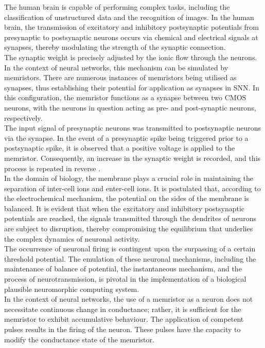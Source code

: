 \noindent The human brain is capable of performing complex tasks, including the classification of unstructured data and the recognition of images. In the human brain, the transmission of excitatory and inhibitory postsynaptic potentials from presynaptic to postsynaptic neurons occurs via chemical and electrical signals at synapses, thereby modulating the strength of the synaptic connection. \\

\noindent The synaptic weight is precisely adjusted by the ionic flow through the neurons. In the context of neural networks, this mechanism can be simulated by memristors. There are numerous instances of memristors being utilised as synapses, thus establishing their potential for application as synapses in SNN. In this configuration, the memristor functions as a synapse between two CMOS neurons, with the neurons in question acting as pre- and post-synaptic neurons, respectively. \\

\noindent The input signal of presynaptic neurons was transmitted to postsynaptic neurons via the synapse. In the event of a presynaptic spike being triggered prior to a postsynaptic spike, it is observed that a positive voltage is applied to the memristor. Consequently, an increase in the synaptic weight is recorded, and this process is repeated in reverse \cite{chang2011short}.\\

\noindent In the domain of biology, the membrane plays a crucial role in maintaining the separation of inter-cell ions and enter-cell ions. It is postulated that, according to the electrochemical mechanism, the potential on the sides of the membrane is balanced. It is evident that when the excitatory and inhibitory postsynaptic potentials are reached, the signals transmitted through the dendrites of neurons are subject to disruption, thereby compromising the equilibrium that underlies the complex dynamics of neuronal activity. \\

\noindent The occurrence of neuronal firing is contingent upon the surpassing of a certain threshold potential. The emulation of these neuronal mechanisms, including the maintenance of balance of potential, the instantaneous mechanism, and the process of neurotransmission, is pivotal in the implementation of a biological plausible neuromorphic computing system.\\

\noindent In the context of neural networks, the use of a memristor as a neuron does not necessitate continuous change in conductance; rather, it is sufficient for the memristor to exhibit accumulative behaviour. The application of competent pulses results in the firing of the neuron. These pulses have the capacity to modify the conductance state of the memristor.\\

